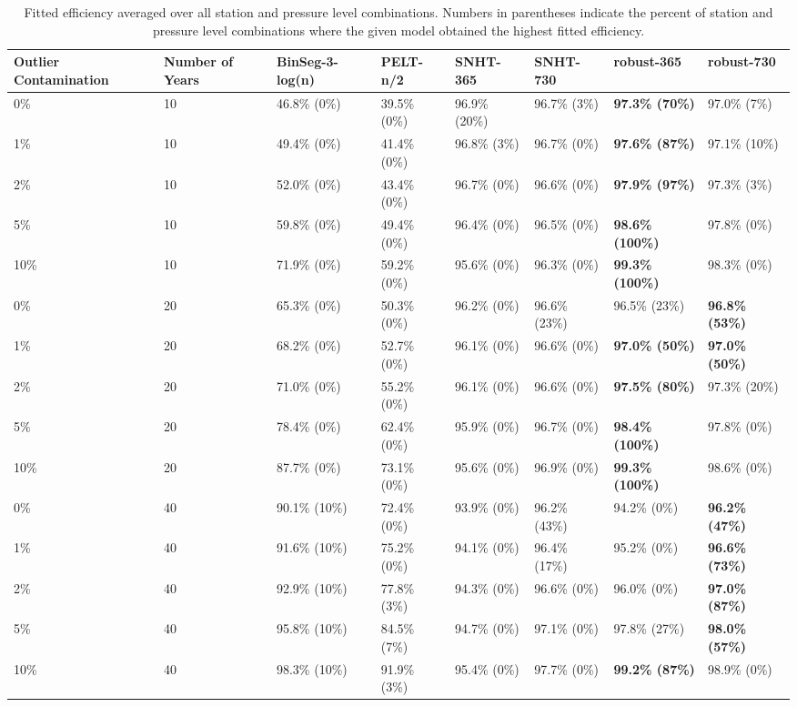 \documentclass[12pt]{article}
\begin{document}
\begin{landscape}
\begin{table}[ht]
\centering
\begin{tabular}{ll|llllll}
  \hline
Outlier Contamination & Number of Years & BinSeg-3-log(n) & PELT-n/2 & SNHT-365 & SNHT-730 & robust-365 & robust-730 \\ 
  \hline
0\% &  10 & 46.8\% (0\%) & 39.5\% (0\%) & 96.9\% (20\%) & 96.7\% (3\%) & \textbf{97.3\% (70\%)} & 97.0\% (7\%) \\ 
  1\% &  10 & 49.4\% (0\%) & 41.4\% (0\%) & 96.8\% (3\%) & 96.7\% (0\%) & \textbf{97.6\% (87\%)} & 97.1\% (10\%) \\ 
  2\% &  10 & 52.0\% (0\%) & 43.4\% (0\%) & 96.7\% (0\%) & 96.6\% (0\%) & \textbf{97.9\% (97\%)} & 97.3\% (3\%) \\ 
  5\% &  10 & 59.8\% (0\%) & 49.4\% (0\%) & 96.4\% (0\%) & 96.5\% (0\%) & \textbf{98.6\% (100\%)} & 97.8\% (0\%) \\ 
  10\% &  10 & 71.9\% (0\%) & 59.2\% (0\%) & 95.6\% (0\%) & 96.3\% (0\%) & \textbf{99.3\% (100\%)} & 98.3\% (0\%) \\ 
  \hline
  0\% &  20 & 65.3\% (0\%) & 50.3\% (0\%) & 96.2\% (0\%) & 96.6\% (23\%) & 96.5\% (23\%) & \textbf{96.8\% (53\%)} \\ 
  1\% &  20 & 68.2\% (0\%) & 52.7\% (0\%) & 96.1\% (0\%) & 96.6\% (0\%) & \textbf{97.0\% (50\%)} & \textbf{97.0\% (50\%)} \\ 
  2\% &  20 & 71.0\% (0\%) & 55.2\% (0\%) & 96.1\% (0\%) & 96.6\% (0\%) & \textbf{97.5\% (80\%)} & 97.3\% (20\%) \\ 
  5\% &  20 & 78.4\% (0\%) & 62.4\% (0\%) & 95.9\% (0\%) & 96.7\% (0\%) & \textbf{98.4\% (100\%)} & 97.8\% (0\%) \\ 
  10\% &  20 & 87.7\% (0\%) & 73.1\% (0\%) & 95.6\% (0\%) & 96.9\% (0\%) & \textbf{99.3\% (100\%)} & 98.6\% (0\%) \\ 
  \hline
  0\% &  40 & 90.1\% (10\%) & 72.4\% (0\%) & 93.9\% (0\%) & 96.2\% (43\%) & 94.2\% (0\%) & \textbf{96.2\% (47\%)} \\ 
  1\% &  40 & 91.6\% (10\%) & 75.2\% (0\%) & 94.1\% (0\%) & 96.4\% (17\%) & 95.2\% (0\%) & \textbf{96.6\% (73\%)} \\ 
  2\% &  40 & 92.9\% (10\%) & 77.8\% (3\%) & 94.3\% (0\%) & 96.6\% (0\%) & 96.0\% (0\%) & \textbf{97.0\% (87\%)} \\ 
  5\% &  40 & 95.8\% (10\%) & 84.5\% (7\%) & 94.7\% (0\%) & 97.1\% (0\%) & 97.8\% (27\%) & \textbf{98.0\% (57\%)} \\ 
  10\% &  40 & 98.3\% (10\%) & 91.9\% (3\%) & 95.4\% (0\%) & 97.7\% (0\%) & \textbf{99.2\% (87\%)} & 98.9\% (0\%) \\ 
\hline
\end{tabular}
\caption{Fitted efficiency averaged over all station and pressure level combinations.  Numbers in parentheses indicate the percent of station and pressure level combinations where the given model obtained the highest fitted efficiency.}
\label{tab:homOrd}
\end{table}
\end{landscape}
\end{document}
